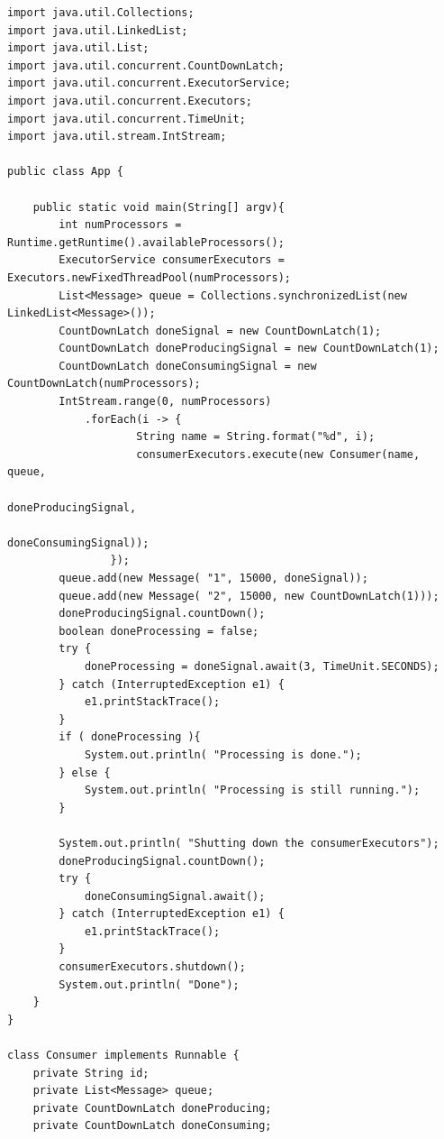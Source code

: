 \documentclass{latex/classes/thesis}
\begin{document}
\begin{lstlisting}
import java.util.Collections;
import java.util.LinkedList;
import java.util.List;
import java.util.concurrent.CountDownLatch;
import java.util.concurrent.ExecutorService;
import java.util.concurrent.Executors;
import java.util.concurrent.TimeUnit;
import java.util.stream.IntStream;

public class App {

    public static void main(String[] argv){
        int numProcessors = Runtime.getRuntime().availableProcessors();
        ExecutorService consumerExecutors = Executors.newFixedThreadPool(numProcessors);
        List<Message> queue = Collections.synchronizedList(new LinkedList<Message>());
        CountDownLatch doneSignal = new CountDownLatch(1);
        CountDownLatch doneProducingSignal = new CountDownLatch(1);
        CountDownLatch doneConsumingSignal = new CountDownLatch(numProcessors);
        IntStream.range(0, numProcessors)
            .forEach(i -> {
                    String name = String.format("%d", i);
                    consumerExecutors.execute(new Consumer(name, queue,
                                                           doneProducingSignal,
                                                           doneConsumingSignal));
                });
        queue.add(new Message( "1", 15000, doneSignal));
        queue.add(new Message( "2", 15000, new CountDownLatch(1)));
        doneProducingSignal.countDown();
        boolean doneProcessing = false;
        try {
            doneProcessing = doneSignal.await(3, TimeUnit.SECONDS);
        } catch (InterruptedException e1) {
            e1.printStackTrace();
        }
        if ( doneProcessing ){
            System.out.println( "Processing is done.");
        } else {
            System.out.println( "Processing is still running.");
        }

        System.out.println( "Shutting down the consumerExecutors");
        doneProducingSignal.countDown();
        try {
            doneConsumingSignal.await();
        } catch (InterruptedException e1) {
            e1.printStackTrace();
        }
        consumerExecutors.shutdown();
        System.out.println( "Done");
    }
}

class Consumer implements Runnable {
    private String id;
    private List<Message> queue;
    private CountDownLatch doneProducing;
    private CountDownLatch doneConsuming;


\end{lstlisting}
\end{document}
